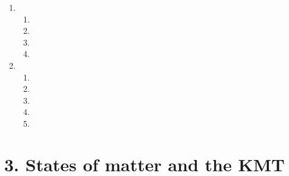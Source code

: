 \begin{enumerate}[itemsep=5pt, label=\textbf{\arabic*}. ]
\item %
\begin{enumerate}[itemsep=5pt,label=\textbf{(\alph*)}]
\item %
\item %
\item %
\item %
\end{enumerate}

\item %
\begin{enumerate}[itemsep=5pt,label=\textbf{(\alph*)}]
\item %
\item %
\item %
\item %
\item %
   

\end{enumerate}
\end{enumerate}



\section {3. States of matter and the KMT}
